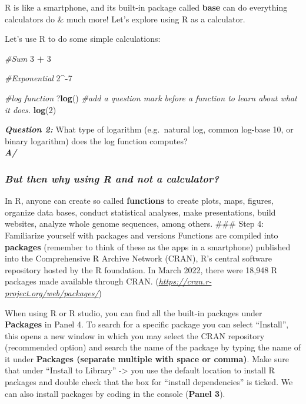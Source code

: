 \documentclass[]{article}
\newenvironment{Shaded}{\begin{snugshade}}{\end{snugshade}}
\newcommand{\CommentTok}[1]{\textcolor[rgb]{0.56,0.35,0.01}{\textit{#1}}}
\newcommand{\DecValTok}[1]{\textcolor[rgb]{0.00,0.00,0.81}{#1}}
\newcommand{\KeywordTok}[1]{\textcolor[rgb]{0.13,0.29,0.53}{\textbf{#1}}}
\newcommand{\NormalTok}[1]{#1}
\newcommand{\OperatorTok}[1]{\textcolor[rgb]{0.81,0.36,0.00}{\textbf{#1}}}
\newcommand{\StringTok}[1]{\textcolor[rgb]{0.31,0.60,0.02}{#1}}
\begin{document}
R is like a smartphone, and its built-in package called \textbf{base}
can do everything calculators do \& much more! Let's explore using R as
a calculator.

Let's use R to do some simple calculations:

\begin{Shaded}
\begin{Highlighting}[]
\CommentTok{#Sum}
\DecValTok{3} \OperatorTok{+}\StringTok{ }\DecValTok{3}

\CommentTok{#Exponential}
\DecValTok{2}\OperatorTok{^-}\DecValTok{7}

\CommentTok{#log function}
\NormalTok{?}\KeywordTok{log}\NormalTok{() }\CommentTok{#add a question mark before a function to learn about what it does.}
\KeywordTok{log}\NormalTok{(}\DecValTok{2}\NormalTok{)}
\end{Highlighting}
\end{Shaded}

\textbf{\emph{Question 2:}} What type of logarithm (e.g.~natural log,
common log-base 10, or binary logarithm) does the log function
computes?\\
\textbf{\emph{A/}}

\hypertarget{but-then-why-using-r-and-not-a-calculator}{%
\subsubsection{\texorpdfstring{\emph{But then why using R and not a
calculator?}}{But then why using R and not a calculator?}}\label{but-then-why-using-r-and-not-a-calculator}}

In R, anyone can create so called \textbf{functions} to create plots,
maps, figures, organize data bases, conduct statistical analyses, make
presentations, build websites, analyze whole genome sequences, among
others. \#\#\# Step 4: Familiarize yourself with packages and versions
Functions are compiled into \textbf{packages} (remember to think of
these as the apps in a smartphone) published into the Comprehensive R
Archive Network (CRAN), R's central software repository hosted by the R
foundation. In March 2022, there were 18,948 R packages made available
through CRAN. (\emph{\url{https://cran.r-project.org/web/packages/}})

When using R or R studio, you can find all the built-in packages under
\textbf{Packages} in Panel 4. To search for a specific package you can
select ``Install'', this opens a new window in which you may select the
CRAN repository (recommended option) and search the name of the package
by typing the name of it under \textbf{Packages (separate multiple with
space or comma)}. Make sure that under ``Install to Library''
-\textgreater{} you use the default location to install R packages and
double check that the box for ``install dependencies'' is ticked. We can
also install packages by coding in the console (\textbf{Panel 3}).
\end{document}
